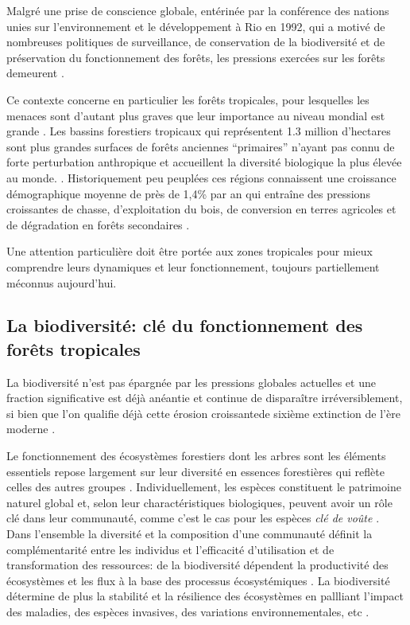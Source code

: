 \documentclass[
  11pt,
  french,
  A4paper,
  extrafontsizes,onecolumn,openright
  ]{memoir}
\begin{document}
Malgré une prise de conscience globale, entérinée par la conférence des
nations unies sur l'environnement et le développement à Rio en 1992, qui
a motivé de nombreuses politiques de surveillance, de conservation de la
biodiversité et de préservation du fonctionnement des forêts, les
pressions exercées sur les forêts demeurent
\autocites{Summit1992}{Schlaepfer2000}{Dirzo2003a}{Morales-Hidalgo2015}.

Ce contexte concerne en particulier les forêts tropicales, pour
lesquelles les menaces sont d'autant plus graves que leur importance au
niveau mondial est grande \autocites{Dirzo2003a}{Hansen2013}. Les
bassins forestiers tropicaux qui représentent 1.3 million d'hectares
sont plus grandes surfaces de forêts anciennes ``primaires'' n'ayant pas
connu de forte perturbation anthropique et accueillent la diversité
biologique la plus élevée au monde. \autocites{Gentry1988}{FAO2011}.
Historiquement peu peuplées ces régions connaissent une croissance
démographique moyenne de près de 1,4\% par an qui entraîne des pressions
croissantes de chasse, d'exploitation du bois, de conversion en terres
agricoles et de dégradation en forêts secondaires \autocite{Asner2009}.

Une attention particulière doit être portée aux zones tropicales pour
mieux comprendre leurs dynamiques et leur fonctionnement, toujours
partiellement méconnus aujourd'hui.

\subsection{La biodiversité: clé du fonctionnement des forêts
tropicales}\label{la-biodiversite-cle-du-fonctionnement-des-forets-tropicales}

La biodiversité n'est pas épargnée par les pressions globales actuelles
et une fraction significative est déjà anéantie et continue de
disparaître irréversiblement, si bien que l'on qualifie déjà cette
érosion croissantede sixième extinction de l'ère moderne
\autocites{Vitousek1997}{Cardinale2012}.

Le fonctionnement des écosystèmes forestiers dont les arbres sont les
éléments essentiels repose largement sur leur diversité en essences
forestières qui reflète celles des autres groupes \autocite{Guitet2017}.
Individuellement, les espèces constituent le patrimoine naturel global
et, selon leur charactéristiques biologiques, peuvent avoir un rôle clé
dans leur communauté, comme c'est le cas pour les espèces \emph{clé de
voûte} \autocites{Jones1994}{Power1996}{Gardner2007}. Dans l'ensemble la
diversité et la composition d'une communauté définit la complémentarité
entre les individus et l'efficacité d'utilisation et de transformation
des ressources: de la biodiversité dépendent la productivité des
écosystèmes et les flux à la base des processus écosystémiques
\autocite{Begon2006}. La biodiversité détermine de plus la stabilité et
la résilience des écosystèmes en pallliant l'impact des maladies, des
espèces invasives, des variations environnementales, etc
\autocite{Elmqvist2003}.
\end{document}
